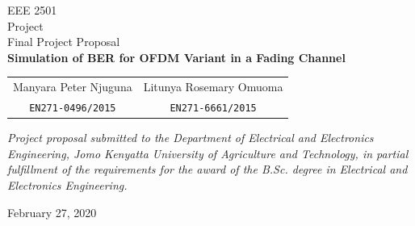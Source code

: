 \begin{spacing}{1.1}
\begin{titlepage}
\begin{center}
		\large{EEE 2501\\Project\\Final Project Proposal\\}
		\vspace*{\fill}
		\Large{\textbf{Simulation of BER for OFDM Variant in a Fading Channel}\\}
		\vspace*{\fill}
		\begin{table}[h!]
			\centering
			\renewcommand{\arraystretch}{1.5}
			\begin{tabular}{c c}
				{ Manyara Peter Njuguna} &{ Litunya Rosemary Omuoma}\\
				\texttt{EN271-0496/2015} &\texttt{EN271-6661/2015}
			\end{tabular}
		\end{table}
		\vspace*{\fill}
		{\normalsize\itshape Project proposal submitted to the Department of Electrical and Electronics Engineering, Jomo Kenyatta University of Agriculture and Technology, in partial fulfillment of the requirements for the award of the B.Sc. degree in Electrical and Electronics Engineering.}
		
		\vspace{1.7cm}
				
		\Large{February 27, 2020}
  \end{center}
\end{titlepage}
\end{spacing}